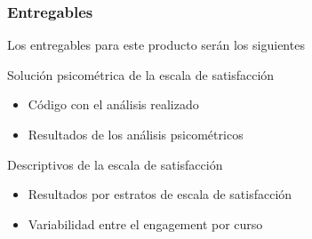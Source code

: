 \documentclass{beamer}
\begin{document}
\begin{frame}
\frametitle{Entregables}

Los \alert{entregables} para este producto serán los siguientes 


\begin{block}{Solución psicométrica de la escala de satisfacción}
\begin{itemize}
\item Código con el análisis realizado
\item Resultados de los análisis psicométricos
\end{itemize}
\end{block}

\begin{block}{Descriptivos de la escala de satisfacción}
\begin{itemize}
\item Resultados por estratos de escala de satisfacción
\item Variabilidad entre el engagement por curso
\end{itemize}
\end{block}




\end{frame}
\end{document}
